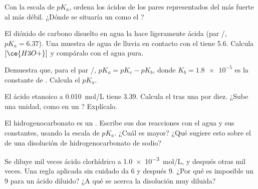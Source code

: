 \begin{exercise}[$\star\star$]\label{exo:g12:ka-and-pka:9}
Con la escala de $pK_a$, ordena los ácidos de los pares representados del
más fuerte al más débil. ¿Dónde se situaría un  como el
?
\end{exercise}

\begin{exercise}[$\star\star$]\label{exo:g12:ka-and-pka:10}
El dióxido de carbono disuelto en agua la hace ligeramente ácida (par
/, $pK_a = 6.37$). Una muestra de agua de lluvia en
contacto con el  tiene  5.6. Calcula $[\ce{H3O+}]$ y compáralo con
el agua pura.
\end{exercise}

\begin{exercise}[$\star\star$]\label{exo:g12:ka-and-pka:11}
Demuestra que, para el par /, $pK_a = pK_e - pK_b$,
donde $K_b = \num{1.8e-5}$ es la constante de
. Calcula el $pK_a$.
\end{exercise}

\begin{exercise}[$\star\star\star$]\label{exo:g12:ka-and-pka:12}
El ácido etanoico a \qty{0.010}{mol/L} tiene  3.39. Calcula el  tras
una  por diez. ¿Sube una unidad, como en un ?
Explícalo.
\end{exercise}

\begin{exercise}[$\star\star\star$]\label{exo:g12:ka-and-pka:13}
El  hidrogenocarbonato es un . Escribe sus dos reacciones con
el agua y sus constantes, usando la escala de $pK_a$. ¿Cuál es mayor?
¿Qué sugiere esto sobre el  de una disolución de hidrogenocarbonato de
sodio?
\end{exercise}

\begin{exercise}[$\star\star\star$]\label{exo:g12:ka-and-pka:14}
Se diluye mil veces ácido clorhídrico a \qty{1.0e-3}{mol/L}, y después
otras mil veces. Una regla aplicada sin cuidado da  6 y después  9.
¿Por qué es imposible un  9 para un ácido diluido? ¿A qué  se acerca
la disolución muy diluida?
\end{exercise}


